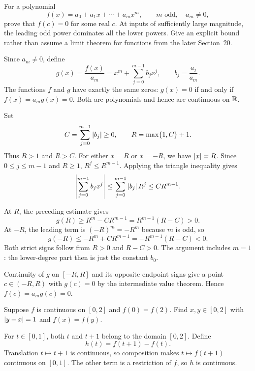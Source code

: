 \goal For a polynomial
\[
 f(x)=a_0+a_1x+\cdots+a_mx^m,
 \qquad m\text{ odd},\quad a_m\ne0,
\]
prove that $f(c)=0$ for some real $c$.
\idea At inputs of sufficiently large magnitude, the leading
odd power dominates all the lower powers. Give an explicit
bound rather than assume a limit theorem for functions from
the later Section~20.

Since $a_m\ne0$, define
\[
 g(x)=\frac{f(x)}{a_m}
 =x^m+\sum_{j=0}^{m-1}b_jx^j,
 \qquad b_j=\frac{a_j}{a_m}.
\]
The functions $f$ and $g$ have exactly the same zeros:
$g(x)=0$ if and only if $f(x)=a_mg(x)=0$.
Both are polynomials and hence are continuous on $\mathbb{R}$.

Set
\[
 C=\sum_{j=0}^{m-1}\left|b_j\right|\ge0,
 \qquad R=\max\{1,C\}+1.
\]
Thus $R>1$ and $R>C$. For either $x=R$ or $x=-R$, we
have $\left|x\right|=R$. Since $0\le j\le m-1$ and $R\ge1$,
$R^j\le R^{m-1}$. Applying the triangle inequality gives
\[
 \left|\sum_{j=0}^{m-1}b_jx^j\right|
 \le\sum_{j=0}^{m-1}\left|b_j\right|R^j
 \le C R^{m-1}.
\]

At $R$, the preceding estimate gives
\[
 g(R)\ge R^m-CR^{m-1}
 =R^{m-1}(R-C)>0.
\]
At $-R$, the leading term is $(-R)^m=-R^m$ because $m$
is odd, so
\[
 g(-R)\le -R^m+CR^{m-1}
 =-R^{m-1}(R-C)<0.
\]
Both strict signs follow from $R>0$ and $R-C>0$.
The argument includes $m=1$: the lower-degree part then is
just the constant $b_0$.

Continuity of $g$ on $[-R,R]$ and its opposite endpoint
signs give a point $c\in(-R,R)$ with $g(c)=0$ by the
intermediate value theorem. Hence $f(c)=a_mg(c)=0$.

\goal Suppose $f$ is continuous on $[0,2]$ and $f(0)=f(2)$.
Find $x,y\in[0,2]$ with $\left|y-x\right|=1$ and $f(x)=f(y)$.

For $t\in[0,1]$, both $t$ and $t+1$ belong to the domain
$[0,2]$. Define
\[
 h(t)=f(t+1)-f(t).
\]
Translation $t\mapsto t+1$ is continuous, so composition
makes $t\mapsto f(t+1)$ continuous on $[0,1]$.
The other term is a restriction of $f$, so $h$ is continuous.

